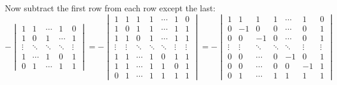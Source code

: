 \documentclass{article}
\begin{document}
\begin{solution}
Now subtract the first row from each row except the last:
\[
-
\begin{vmatrix}
1 & 1 & \cdots & 1 & 0 \\
1 & 0 & 1 & \cdots & 1 \\
\vdots & \ddots & \ddots & \ddots & \vdots \\
1 & \cdots & 1 & 0 & 1 \\ 
0 & 1 & \cdots & 1 & 1 
\end{vmatrix}
=
-
\begin{vmatrix}
1 & 1 & 1 & 1 & \cdots & 1 & 0 \\
1 & 0 & 1 & 1 & \cdots & 1 & 1 \\
1 & 1 & 0 & 1 & \cdots & 1 & 1 \\
\vdots & \vdots & \ddots & \ddots & \ddots & \vdots & \vdots \\
1 & 1 & \cdots & 1 & 0 & 1 & 1 \\ 
1 & 1 & \cdots & 1 & 1 & 0 & 1 \\ 
0 & 1 & \cdots & 1 & 1 & 1 & 1 
\end{vmatrix}
=
-
\begin{vmatrix}
1 & 1 & 1 & 1 & \cdots & 1 & 0 \\
0 & -1 & 0 & 0 & \cdots & 0 & 1 \\
0 & 0 & -1 & 0 & \cdots & 0 & 1 \\
\vdots & \vdots & \ddots & \ddots & \ddots & \vdots & \vdots \\
0 & 0 & \cdots & 0 & -1 & 0 & 1 \\ 
0 & 0 & \cdots & 0 & 0 & -1 & 1 \\ 
0 & 1 & \cdots & 1 & 1 & 1 & 1 
\end{vmatrix}
\]


\end{solution}
\end{document}
